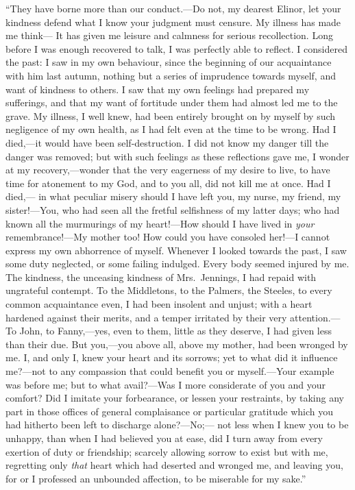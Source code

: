 \documentclass{article}
\begin{document}
``They have borne more than our conduct.---Do not,
my dearest Elinor, let your kindness defend what I know
your judgment must censure.  My illness has made me think---%
It has given me leisure and calmness for serious recollection.
Long before I was enough recovered to talk, I was perfectly
able to reflect.  I considered the past: I saw in my
own behaviour, since the beginning of our acquaintance
with him last autumn, nothing but a series of imprudence
towards myself, and want of kindness to others.
I saw that my own feelings had prepared my sufferings,
and that my want of fortitude under them had almost led
me to the grave.  My illness, I well knew, had been
entirely brought on by myself by such negligence of my
own health, as I had felt even at the time to be wrong.
Had I died,---it would have been self-destruction. I
did not know my danger till the danger was removed;
but with such feelings as these reflections gave me,
I wonder at my recovery,---wonder that the very eagerness
of my desire to live, to have time for atonement to my God,
and to you all, did not kill me at once.  Had I died,---%
in what peculiar misery should I have left you, my nurse,
my friend, my sister!---You, who had seen all the fretful
selfishness of my latter days; who had known all the
murmurings of my heart!---How should I have lived in \emph{your}
remembrance!---My mother too! How could you have consoled
her!---I cannot express my own abhorrence of myself.
Whenever I looked towards the past, I saw some duty neglected,
or some failing indulged.  Every body seemed injured by me.
The kindness, the unceasing kindness of Mrs.\ Jennings,
I had repaid with ungrateful contempt.  To the Middletons,
to the Palmers, the Steeles, to every common acquaintance even,
I had been insolent and unjust; with a heart hardened
against their merits, and a temper irritated by their
very attention.---To John, to Fanny,---yes, even to them,
little as they deserve, I had given less than their due.
But you,---you above all, above my mother, had been wronged
by me.  I, and only I, knew your heart and its sorrows;
yet to what did it influence me?---not to any compassion
that could benefit you or myself.---Your example was
before me; but to what avail?---Was I more considerate
of you and your comfort?  Did I imitate your forbearance,
or lessen your restraints, by taking any part in those
offices of general complaisance or particular gratitude
which you had hitherto been left to discharge alone?---No;---%
not less when I knew you to be unhappy, than when I
had believed you at ease, did I turn away from every
exertion of duty or friendship; scarcely allowing sorrow
to exist but with me, regretting only \emph{that} heart
which had deserted and wronged me, and leaving you,
for or I professed an unbounded affection, to be miserable
for my sake.''
\end{document}
